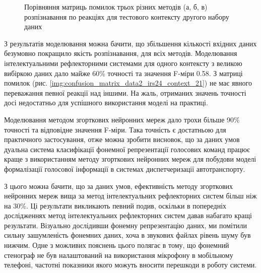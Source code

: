 \begin{figure}[ht!]
	\centering
	
	\caption{Порівняння матриць помилок трьох різних методів (а, б, в) розпізнавання по реакціях для тестового контексту другого набору даних}
	\label{img:confusion_matrix_data2_context_21}
\end{figure}

З результатів моделювання можна бачити, що збільшення кількості вхідних даних безумовно покращило якість розпізнавання, для всіх методів. Моделювання інтелектуальними рефлекторними системами для одного контексту з великою вибіркою даних дало майже 60\% точності та значення F-міри 0.58. З матриці помилок (рис. \ref{img:confusion_matrix_data2_irs24_context_21}) не має явного переважання певної реакції над іншими. На жаль, отриманих значень точності досі недостатньо для успішного використання моделі на практиці. 

Моделювання методом згорткових нейронних мереж дало трохи більше 90\% точності та відповідне значення F-міри. Така точність є достатньою для практичного застосування, отже можна зробити висновок, що за даних умов дуальна система класифікації фонемної репрезентації голосових команд працює краще з використанням методу згорткових нейронних мереж для побудови моделі формалізації голосової інформації в системах диспетчеризації автотранспорту.

З цього можна бачити, що за даних умов, ефективність методу згорткових нейронних мереж вища за метод інтелектуальних рефлекторних систем більш ніж на 30\%. Ці результати викликають певний подив, оскільки в попередніх дослідженнях \cite{Egorchenkov_2016,Teslia_2014,Teslia_2013} метод інтелектуальних рефлекторних систем давав набагато кращі результати. Візуально дослідивши фонемну репрезентацію даних, ми помітили сильну зашумленість фонемних даних, хоча в звукових файлах рівень шуму був нижчим. Одне з можливих пояснень цього полягає в тому, що фонемний стенограф не був налаштований на використання мікрофону в мобільному телефоні, частотні показники якого можуть вносити перешкоди в роботу системи.  

